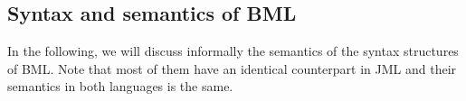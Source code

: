 \begin{longtable}{ll}
 
\end{longtable}


\subsection{Syntax and semantics of BML}

In the following, we will discuss informally the semantics of the syntax structures of BML.
Note that most of them have an identical counterpart in JML
 and their semantics in both languages is the same. 


